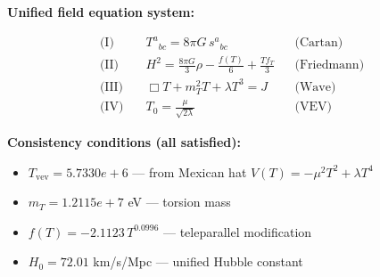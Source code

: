 
\textbf{Unified field equation system:}

\begin{align}
  \text{(I)} \quad & T^a{}_{bc} = 8\pi G \, s^a{}_{bc} && \text{(Cartan)} \\
  \text{(II)} \quad & H^2 = \frac{8\pi G}{3}\rho - \frac{f(T)}{6} + \frac{Tf_T}{3} && \text{(Friedmann)} \\
  \text{(III)} \quad & \Box T + m_T^2 T + \lambda T^3 = J && \text{(Wave)} \\
  \text{(IV)} \quad & T_0 = \frac{\mu}{\sqrt{2\lambda}} && \text{(VEV)}
\end{align}

\textbf{Consistency conditions (all satisfied):}
\begin{itemize}
  \item $T_{\text{vev}} = 5.7330e+6$ — from Mexican hat $V(T) = -\mu^2 T^2 + \lambda T^4$
  \item $m_T = 1.2115e+7$ eV — torsion mass
  \item $f(T) = -2.1123 \, T^{0.0996}$ — teleparallel modification
  \item $H_0 = 72.01$ km/s/Mpc — unified Hubble constant
\end{itemize}